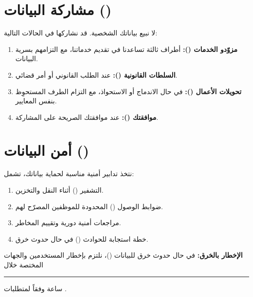 \documentclass[12pt,a4paper]{article}
\begin{document}
\section{مشاركة البيانات ()}
\label{sec:sharing}
لا نبيع بياناتك الشخصية. قد نشاركها في الحالات التالية:
\begin{enumerate}
    \item \textbf{مزوّدو الخدمات ():} أطراف ثالثة تساعدنا في تقديم خدماتنا، مع التزامهم بسرية البيانات.
    \item \textbf{السلطات القانونية ():} عند الطلب القانوني أو أمر قضائي.
    \item \textbf{تحويلات الأعمال ():} في حال الاندماج أو الاستحواذ، مع التزام الطرف المستحوِظ بنفس المعايير.
    \item \textbf{موافقتك ():} عند موافقتك الصريحة على المشاركة.
\end{enumerate}

\section{أمن البيانات ()}
\label{sec:security}
نتخذ تدابير أمنية مناسبة لحماية بياناتك، تشمل:
\begin{enumerate}
    \item التشفير () أثناء النقل والتخزين.
    \item ضوابط الوصول () المحدودة للموظفين المصرّح لهم.
    \item مراجعات أمنية دورية وتقييم المخاطر.
    \item خطة استجابة للحوادث () في حال حدوث خرق.
\end{enumerate}

\noindent\textbf{الإخطار بالخرق:} في حال حدوث خرق للبيانات ()، نلتزم بإخطار المستخدمين والجهات المختصة خلال \rule{2cm}{0.4pt} ساعة وفقاً لمتطلبات .

\end{document}
